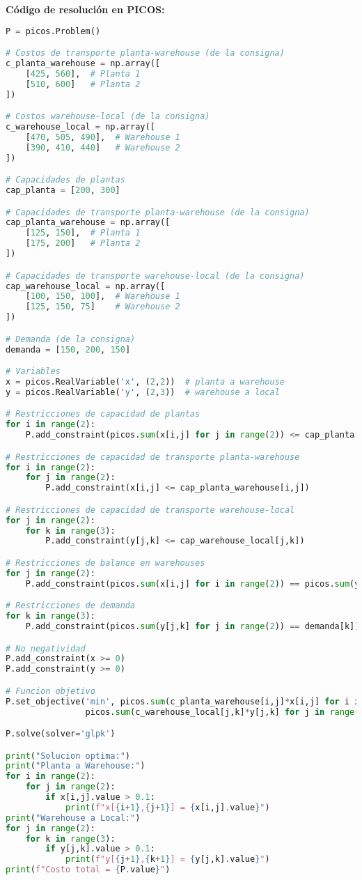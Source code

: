 \documentclass[12pt]{article}
\begin{document}
\textbf{Código de resolución en PICOS:}
\begin{lstlisting}[language=Python]
P = picos.Problem()

# Costos de transporte planta-warehouse (de la consigna)
c_planta_warehouse = np.array([
    [425, 560],  # Planta 1
    [510, 600]   # Planta 2
])

# Costos warehouse-local (de la consigna)
c_warehouse_local = np.array([
    [470, 505, 490],  # Warehouse 1
    [390, 410, 440]   # Warehouse 2
])

# Capacidades de plantas
cap_planta = [200, 300]

# Capacidades de transporte planta-warehouse (de la consigna)
cap_planta_warehouse = np.array([
    [125, 150],  # Planta 1
    [175, 200]   # Planta 2
])

# Capacidades de transporte warehouse-local (de la consigna)
cap_warehouse_local = np.array([
    [100, 150, 100],  # Warehouse 1
    [125, 150, 75]    # Warehouse 2
])

# Demanda (de la consigna)
demanda = [150, 200, 150]

# Variables
x = picos.RealVariable('x', (2,2))  # planta a warehouse
y = picos.RealVariable('y', (2,3))  # warehouse a local

# Restricciones de capacidad de plantas
for i in range(2):
    P.add_constraint(picos.sum(x[i,j] for j in range(2)) <= cap_planta[i])

# Restricciones de capacidad de transporte planta-warehouse
for i in range(2):
    for j in range(2):
        P.add_constraint(x[i,j] <= cap_planta_warehouse[i,j])

# Restricciones de capacidad de transporte warehouse-local
for j in range(2):
    for k in range(3):
        P.add_constraint(y[j,k] <= cap_warehouse_local[j,k])

# Restricciones de balance en warehouses
for j in range(2):
    P.add_constraint(picos.sum(x[i,j] for i in range(2)) == picos.sum(y[j,k] for k in range(3)))

# Restricciones de demanda
for k in range(3):
    P.add_constraint(picos.sum(y[j,k] for j in range(2)) == demanda[k])

# No negatividad
P.add_constraint(x >= 0)
P.add_constraint(y >= 0)

# Funcion objetivo
P.set_objective('min', picos.sum(c_planta_warehouse[i,j]*x[i,j] for i in range(2) for j in range(2)) +
                picos.sum(c_warehouse_local[j,k]*y[j,k] for j in range(2) for k in range(3)))

P.solve(solver='glpk')

print("Solucion optima:")
print("Planta a Warehouse:")
for i in range(2):
    for j in range(2):
        if x[i,j].value > 0.1:
            print(f"x[{i+1},{j+1}] = {x[i,j].value}")
print("Warehouse a Local:")
for j in range(2):
    for k in range(3):
        if y[j,k].value > 0.1:
            print(f"y[{j+1},{k+1}] = {y[j,k].value}")
print(f"Costo total = {P.value}")
\end{lstlisting}
\end{document}
